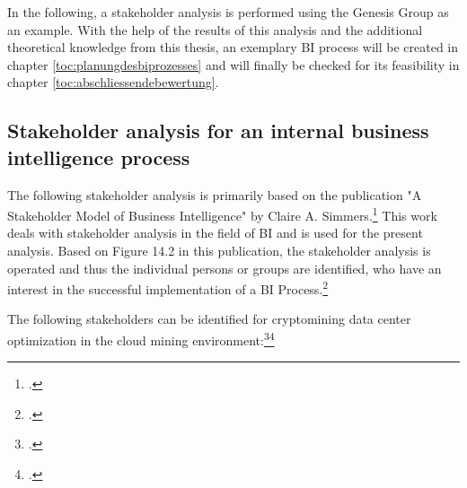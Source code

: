 In the following, a stakeholder analysis is performed using the Genesis Group as an example. With the help of the results of this analysis and the additional
theoretical knowledge from this thesis, an exemplary \ac{BI} process will be created in chapter \ref{toc:planungdesbiprozesses} and will
finally be checked for its feasibility in chapter \ref{toc:abschliessendebewertung}.

\subsection{Stakeholder analysis for an internal business intelligence process} \label{toc:stakeholderanalyse}

The following stakeholder analysis is primarily based on the publication "A Stakeholder Model of Business
Intelligence" by Claire A. Simmers.\footcite[Cf.][]{simmers2004stakeholder} This work deals with
stakeholder analysis in the field of \ac{BI} and is used for the present analysis. Based on
Figure 14.2 in this publication, the stakeholder analysis is operated and thus the individual persons or groups are identified,
who have an interest in the successful implementation of a \ac{BI} Process.\footcite[Cf.][Fig. 14.2]{simmers2004stakeholder}

The following stakeholders can be identified for cryptomining data center optimization in the cloud mining environment:\footcite[Cf.][Fig. 14.2]{simmers2004stakeholder}\footcite[Cf.][p. 52]{reed2009s}

